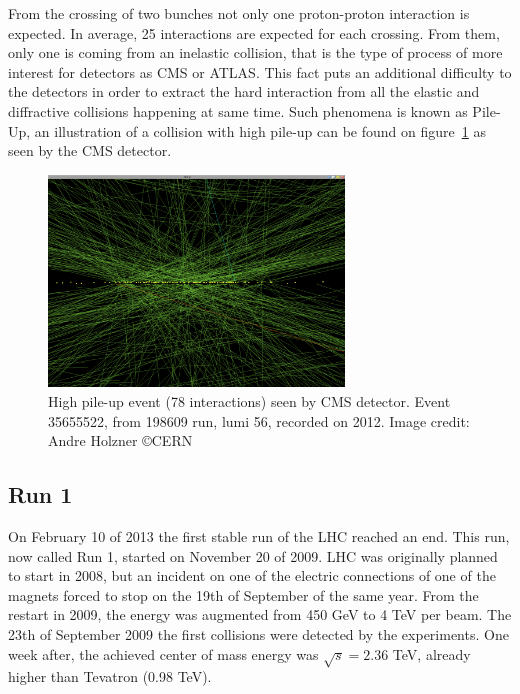 From the crossing of two bunches not only one proton-proton interaction is expected. In average, 25 interactions are expected for each crossing. From them, only one is coming from an inelastic collision, that is the type of process of more interest for detectors as CMS or ATLAS. This fact puts an additional difficulty to the detectors in order to extract the hard interaction from all the elastic and diffractive collisions happening at same time. Such phenomena is known as Pile-Up, an illustration of a collision with high pile-up can be found on figure~\ref{fig:pileup} as seen by the CMS detector.

\begin{figure}[!Hhtbp]
  \begin{center}
    \includegraphics[width=0.7\textwidth]{figs/pileup.png}
    \caption{High pile-up event (78 interactions) seen by CMS detector. Event 35655522, from 198609 run, lumi 56, recorded on 2012. Image credit: Andre Holzner \copyright CERN}
    \label{fig:pileup}
  \end{center}
\end{figure}

\subsection{Run 1}
\label{sec:run1}

On February 10 of 2013 the first stable run of the LHC reached an end. This run, now called Run 1, started on November 20 of 2009. LHC was originally planned to start in 2008, but an incident on one of the electric connections of one of the magnets forced to stop on the 19th of September of the same year. From the restart in 2009, the energy was augmented from 450 GeV to 4 TeV per beam. The 23th of September 2009 the first collisions were detected by the experiments. One week after, the achieved center of mass energy was $\sqrt{s}=2.36$ TeV, already higher than Tevatron (0.98 TeV).

